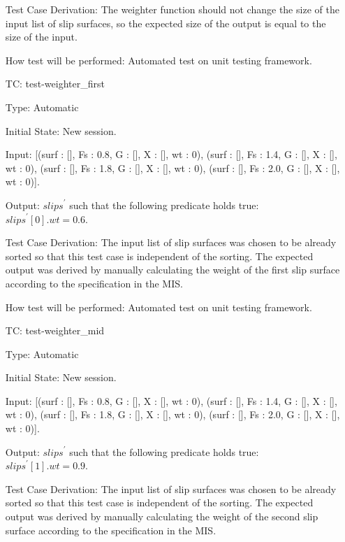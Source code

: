 \documentclass[12pt, titlepage]{article}
\newcounter{utestnum} %
\begin{document}
\begin{enumerate}[label=TC\arabic*:,ref={\arabic*}]
	Test Case Derivation: The weighter function should not change the size of 
	the input list of slip surfaces, so the expected size of the output is 
	equal to the size of the input.
	
	How test will be performed: Automated test on unit testing framework.
	
	\item [TC\refstepcounter{utestnum}\theutestnum: \label{TC_WeighterFirst}] 
	test-weighter\_first
	
	Type: Automatic
	
	Initial State: New session.
	
	Input: [(surf : [], Fs : 0.8, G : [], X : [], wt : 0), (surf : [], Fs : 
	1.4, G : [], X : [], wt : 0), (surf : [], Fs : 1.8, G : [], X : [], wt : 
	0), (surf : [], Fs : 2.0, G : [], X : [], wt : 0)].
	
	Output: $\textit{slips}^\prime$ such that the following predicate holds 
	true:\\ 
	$\textit{slips}^\prime[0].wt = 0.6$.

	Test Case Derivation: The input list of slip surfaces was chosen to be 
	already 
	sorted so that this test case is independent of the sorting. The expected 
	output was derived by manually calculating the weight of the first slip 
	surface according to the specification in the MIS.

	How test will be performed: Automated test on unit testing framework.
	
	\item [TC\refstepcounter{utestnum}\theutestnum: \label{TC_WeighterMid}] 
	test-weighter\_mid
	
	Type: Automatic
	
	Initial State: New session.
	
	Input: [(surf : [], Fs : 0.8, G : [], X : [], wt : 0), (surf : [], Fs : 
	1.4, G : [], X : [], wt : 0), (surf : [], Fs : 1.8, G : [], X : [], wt : 
	0), (surf : [], Fs : 2.0, G : [], X : [], wt : 0)].
	
	Output: $\textit{slips}^\prime$ such that the following predicate holds 
	true:\\ 
	$\textit{slips}^\prime[1].wt = 0.9$.
	
	Test Case Derivation: The input list of slip surfaces was chosen to be 
	already 
	sorted so that this test case is independent of the sorting. The expected 
	output was derived by manually calculating the weight of the second slip 
	surface according to the specification in the MIS.
	

\end{enumerate}
\end{document}
